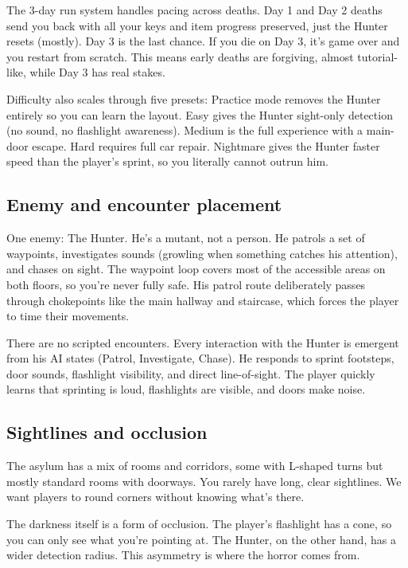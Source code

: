 \documentclass[12pt, a4paper]{article}
\begin{document}
The 3-day run system handles pacing across deaths. Day 1 and Day 2 deaths send you back with all your keys and item progress preserved, just the Hunter resets (mostly). Day 3 is the last chance. If you die on Day 3, it's game over and you restart from scratch. This means early deaths are forgiving, almost tutorial-like, while Day 3 has real stakes.

Difficulty also scales through five presets: Practice mode removes the Hunter entirely so you can learn the layout. Easy gives the Hunter sight-only detection (no sound, no flashlight awareness). Medium is the full experience with a main-door escape. Hard requires full car repair. Nightmare gives the Hunter faster speed than the player's sprint, so you literally cannot outrun him.

\subsection{Enemy and encounter placement}

One enemy: The Hunter. He's a mutant, not a person. He patrols a set of waypoints, investigates sounds (growling when something catches his attention), and chases on sight. The waypoint loop covers most of the accessible areas on both floors, so you're never fully safe. His patrol route deliberately passes through chokepoints like the main hallway and staircase, which forces the player to time their movements.

There are no scripted encounters. Every interaction with the Hunter is emergent from his AI states (Patrol, Investigate, Chase). He responds to sprint footsteps, door sounds, flashlight visibility, and direct line-of-sight. The player quickly learns that sprinting is loud, flashlights are visible, and doors make noise.

\subsection{Sightlines and occlusion}

The asylum has a mix of rooms and corridors, some with L-shaped turns but mostly standard rooms with doorways. You rarely have long, clear sightlines. We want players to round corners without knowing what's there.

The darkness itself is a form of occlusion. The player's flashlight has a cone, so you can only see what you're pointing at. The Hunter, on the other hand, has a wider detection radius. This asymmetry is where the horror comes from.
\end{document}
